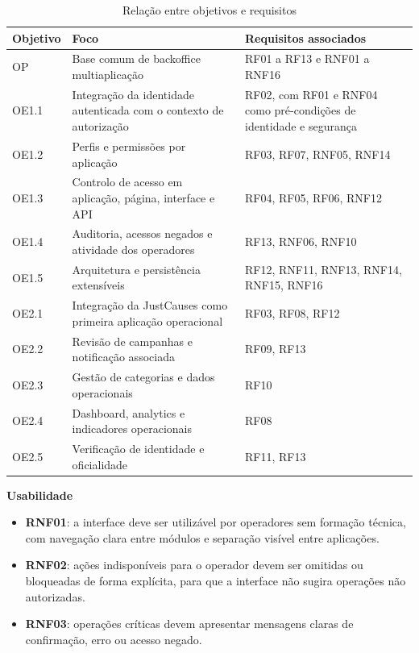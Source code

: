 \begin{table}[H]
\caption{Relação entre objetivos e requisitos}
\label{tab:mapeamento_objetivos_requisitos}
\begin{center}
\small
\begin{tabular}{|p{2.2cm}|p{5.2cm}|p{5.4cm}|}
\hline
\textbf{Objetivo} & \textbf{Foco} & \textbf{Requisitos associados} \\ \hline
OP & Base comum de backoffice multiaplicação & RF01 a RF13 e RNF01 a RNF16 \\ \hline
OE1.1 & Integração da identidade autenticada com o contexto de autorização & RF02, com RF01 e RNF04 como pré-condições de identidade e segurança \\ \hline
OE1.2 & Perfis e permissões por aplicação & RF03, RF07, RNF05, RNF14 \\ \hline
OE1.3 & Controlo de acesso em aplicação, página, interface e \gls{API} & RF04, RF05, RF06, RNF12 \\ \hline
OE1.4 & Auditoria, acessos negados e atividade dos operadores & RF13, RNF06, RNF10 \\ \hline
OE1.5 & Arquitetura e persistência extensíveis & RF12, RNF11, RNF13, RNF14, RNF15, RNF16 \\ \hline
OE2.1 & Integração da JustCauses como primeira aplicação operacional & RF03, RF08, RF12 \\ \hline
OE2.2 & Revisão de campanhas e notificação associada & RF09, RF13 \\ \hline
OE2.3 & Gestão de categorias e dados operacionais & RF10 \\ \hline
OE2.4 & Dashboard, analytics e indicadores operacionais & RF08 \\ \hline
OE2.5 & Verificação de identidade e oficialidade & RF11, RF13 \\ \hline
\end{tabular}
\end{center}
\end{table}

\noindent\textbf{Usabilidade}
\begin{itemize}
  \item \textbf{RNF01}: a interface deve ser utilizável por operadores sem formação técnica, com navegação clara entre módulos e separação visível entre aplicações.
  \item \textbf{RNF02}: ações indisponíveis para o operador devem ser omitidas ou bloqueadas de forma explícita, para que a interface não sugira operações não autorizadas.
  \item \textbf{RNF03}: operações críticas devem apresentar mensagens claras de confirmação, erro ou acesso negado.
\end{itemize}

